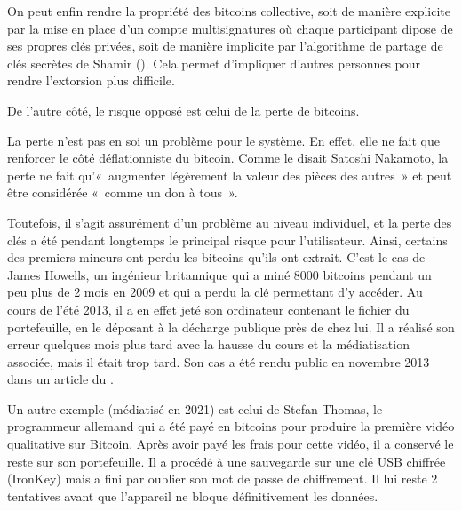 On peut enfin rendre la propriété des bitcoins collective, soit de manière explicite par la mise en place d'un compte multisignatures où chaque participant dipose de ses propres clés privées, soit de manière implicite par l'algorithme de partage de clés secrètes de Shamir (). Cela permet d'impliquer d'autres personnes pour rendre l'extorsion plus difficile. 

De l'autre côté, le risque opposé est celui de la perte de bitcoins. 

La perte n'est pas en soi un problème pour le système. En effet, elle ne fait que renforcer le côté déflationniste du bitcoin. Comme le disait Satoshi Nakamoto, la perte ne fait qu'«~augmenter légèrement la valeur des pièces des autres~» et peut être considérée «~comme un don à tous~».

Toutefois, il s'agit assurément d'un problème au niveau individuel, et la perte des clés a été pendant longtemps le principal risque pour l'utilisateur. Ainsi, certains des premiers mineurs ont perdu les bitcoins qu'ils ont extrait. C'est le cas de James Howells, un ingénieur britannique qui a miné 8000 bitcoins pendant un peu plus de 2 mois en 2009 et qui a perdu la clé permettant d'y accéder. Au cours de l’été 2013, il a en effet jeté son ordinateur contenant le fichier du portefeuille, en le déposant à la décharge publique près de chez lui. Il a réalisé son erreur quelques mois plus tard avec la hausse du cours et la médiatisation associée, mais il était trop tard. Son cas a été rendu public en novembre 2013 dans un article du .

Un autre exemple (médiatisé en 2021) est celui de Stefan Thomas, le programmeur allemand qui a été payé en bitcoins pour produire la première vidéo qualitative sur Bitcoin. Après avoir payé les frais pour cette vidéo, il a conservé le reste sur son portefeuille. Il a procédé à une sauvegarde sur une clé USB chiffrée (IronKey) mais a fini par oublier son mot de passe de chiffrement. Il lui reste 2 tentatives avant que l'appareil ne bloque définitivement les données.

